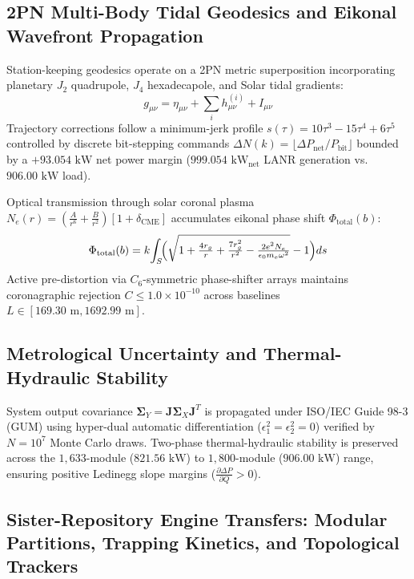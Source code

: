 \documentclass[twocolumn,aps,pra,floatfix,superscriptaddress,10pt]{revtex4-2}
\begin{document}
\subsection{2PN Multi-Body Tidal Geodesics and Eikonal Wavefront Propagation}
Station-keeping geodesics operate on a 2PN metric superposition incorporating planetary $J_2$ quadrupole, $J_4$ hexadecapole, and Solar tidal gradients:
\begin{equation}
    g_{\mu\nu} = \eta_{\mu\nu} + \sum_{i} h_{\mu\nu}^{(i)} + I_{\mu\nu}
\end{equation}
Trajectory corrections follow a minimum-jerk profile $s(\tau) = 10\tau^3 - 15\tau^4 + 6\tau^5$ controlled by discrete bit-stepping commands $\Delta N(k) = \lfloor \Delta P_{\text{net}} / P_{\text{bit}} \rfloor$ bounded by a $+93.054\text{~kW}$ net power margin ($999.054\text{~kW}_{\text{net}}$ LANR generation vs. $906.00\text{~kW}$ load).

Optical transmission through solar coronal plasma $N_e(r) = \left(\frac{A}{r^6} + \frac{B}{r^2}\right)[1 + \delta_{\text{CME}}]$ accumulates eikonal phase shift $\Phi_{\text{total}}(b)$:
\begin{equation}
    \Phi_{\text{total}}(b) = k \!\int_{S}\! \Bigl( \sqrt{1 + \tfrac{4 r_g}{r} + \tfrac{7 r_g^2}{r^2} - \tfrac{2 e^2 N_e}{\epsilon_0 m_e \omega^2}} - 1 \Bigr) ds
\end{equation}
Active pre-distortion via $C_6$-symmetric phase-shifter arrays maintains coronagraphic rejection $C \le 1.0 \times 10^{-10}$ across baselines $L \in [169.30\text{~m}, 1692.99\text{~m}]$.

\subsection{Metrological Uncertainty and Thermal-Hydraulic Stability}
System output covariance $\mathbf{\Sigma}_Y = \mathbf{J} \mathbf{\Sigma}_X \mathbf{J}^T$ is propagated under ISO/IEC Guide 98-3 (GUM) using hyper-dual automatic differentiation ($\epsilon_1^2 = \epsilon_2^2 = 0$) verified by $N = 10^7$ Monte Carlo draws. Two-phase thermal-hydraulic stability is preserved across the $1,633$-module ($821.56\text{~kW}$) to $1,800$-module ($906.00\text{~kW}$) range, ensuring positive Ledinegg slope margins ($\frac{\partial \Delta P}{\partial Q} > 0$).

\subsection{Sister-Repository Engine Transfers: Modular Partitions, Trapping Kinetics, and Topological Trackers}
\end{document}
